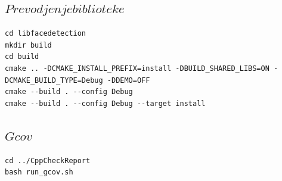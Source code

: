 \documentclass{article}
\begin{document}
\subsection*{$Prevodjenje biblioteke$}

\begin{verbatim}
cd libfacedetection
mkdir build
cd build
cmake .. -DCMAKE_INSTALL_PREFIX=install -DBUILD_SHARED_LIBS=ON -DCMAKE_BUILD_TYPE=Debug -DDEMO=OFF
cmake --build . --config Debug
cmake --build . --config Debug --target install
\end{verbatim}

\subsection*{$Gcov$}
\begin{verbatim}
cd ../CppCheckReport
bash run_gcov.sh
\end{verbatim}

\selectfont


\selectfont

\end{document}
